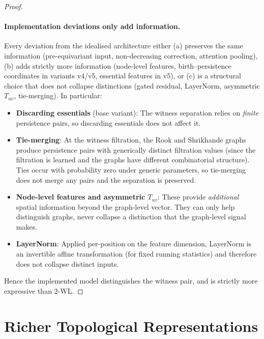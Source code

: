 \begin{proof}
\paragraph{Implementation deviations only add information.}
Every deviation from the idealised architecture either (a) preserves the same information (pre-equivariant input, non-decreasing correction, attention pooling), (b) adds strictly more information (node-level features, birth--persistence coordinates in variants v4/v5, essential features in v5), or (c) is a structural choice that does not collapse distinctions (gated residual, LayerNorm, asymmetric $T_{uv}$, tie-merging). In particular:
\begin{itemize}
    \item \textbf{Discarding essentials} (base variant): The witness separation relies on \emph{finite} persistence pairs, so discarding essentials does not affect it.
    \item \textbf{Tie-merging}: At the witness filtration, the Rook and Shrikhande graphs produce persistence pairs with generically distinct filtration values (since the filtration is learned and the graphs have different combinatorial structure). Ties occur with probability zero under generic parameters, so tie-merging does not merge any pairs and the separation is preserved.
    \item \textbf{Node-level features and asymmetric $T_{uv}$}: These provide \emph{additional} spatial information beyond the graph-level vector. They can only help distinguish graphs, never collapse a distinction that the graph-level signal makes.
    \item \textbf{LayerNorm}: Applied per-position on the feature dimension, LayerNorm is an invertible affine transformation (for fixed running statistics) and therefore does not collapse distinct inputs.
\end{itemize}

Hence the implemented model distinguishes the witness pair, and is strictly more expressive than $2$-WL.
\end{proof}



\section{Richer Topological Representations}
\label{sec:extensions}

